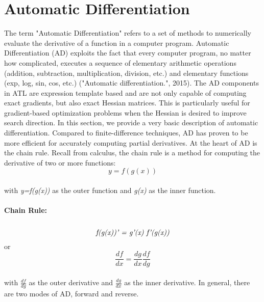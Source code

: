 \documentclass[12pt,a4paper]{article}
\begin{document}
\section{Automatic Differentiation}
The term "Automatic Differentiation" refers to a set of methods to numerically evaluate the derivative of a function in a computer program. Automatic Differentiation (AD) exploits the fact that every computer program, no matter how complicated, executes a sequence of elementary arithmetic operations (addition, subtraction, multiplication, division, etc.) and elementary functions (exp, log, sin, cos, etc.) ("Automatic differentiation.", 2015). The AD components in ATL are expression template based and are not only capable of computing exact gradients, but also exact Hessian matrices. This is particularly useful for gradient-based optimization problems when the Hessian is desired to improve search direction.
In this section, we provide a very basic description of automatic differentiation. Compared to finite-difference techniques, AD has proven to be more efficient for accurately computing partial derivatives. At the heart of AD is the chain rule. Recall from calculus, the chain rule is a method for computing the derivative of two or more functions:\\
 \begin{equation}
 y = f(g(x)) 
 \end{equation}
  \\
 with \textit{y=f(g(x))} as the outer function and \textit{g(x)} as the inner function. \\ 
 \\
 \textbf{Chain Rule:} \\ \\
  \begin{equation}
 \textit{f(g(x))' = g'(x) f'(g(x))} \\
 \end{equation}
 or \\
\begin{equation}
\frac{df}{dx} = \frac{dg}{dx}\frac{df}{dg}
\end{equation}
\\
with \textit{$\frac{df}{dg}$} as the outer derivative and \textit{$\frac{dg}{dx}$} as the inner derivative. In general,
there are two modes of AD, forward and reverse. 
\end{document}
